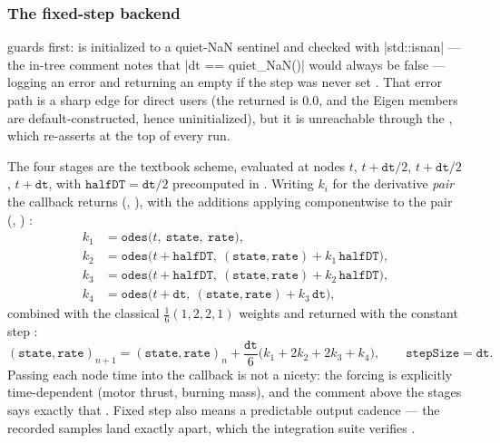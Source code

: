 \subsubsection{The fixed-step backend}\label{sec:simcore-rk4}

 guards first:  is initialized to a quiet-NaN sentinel
 and checked with \cppinline|std::isnan| --- the in-tree comment notes
that \cppinline|dt == quiet_NaN()| would always be false --- logging an error and returning an
empty  if the step was never set . That error
path is a sharp edge for direct users (the returned  is $0.0$, and the Eigen
members are default-constructed, hence uninitialized), but it is unreachable through the
, which re-asserts  at the top of every run.

The four stages are the textbook scheme, evaluated at nodes $t$, $t+\mathtt{dt}/2$,
$t+\mathtt{dt}/2$, $t+\mathtt{dt}$, with $\mathtt{halfDT}=\mathtt{dt}/2$ precomputed in
 . Writing $k_i$ for the derivative \emph{pair} the
callback returns (, ), with the additions applying componentwise to
the pair (, ) :
\begin{align}
k_1 &= \mathtt{odes}\bigl(t,\ \mathtt{state},\ \mathtt{rate}\bigr), \nonumber\\
k_2 &= \mathtt{odes}\bigl(t+\mathtt{halfDT},\ (\mathtt{state},\mathtt{rate}) + k_1\,\mathtt{halfDT}\bigr), \nonumber\\
k_3 &= \mathtt{odes}\bigl(t+\mathtt{halfDT},\ (\mathtt{state},\mathtt{rate}) + k_2\,\mathtt{halfDT}\bigr), \nonumber\\
k_4 &= \mathtt{odes}\bigl(t+\mathtt{dt},\ (\mathtt{state},\mathtt{rate}) + k_3\,\mathtt{dt}\bigr),
\label{eq:simcore-rk4stages}
\end{align}
combined with the classical $\tfrac16(1,2,2,1)$ weights and returned with the constant step
:
\begin{equation}\label{eq:simcore-rk4}
(\mathtt{state},\mathtt{rate})_{n+1}
 = (\mathtt{state},\mathtt{rate})_n
 + \frac{\mathtt{dt}}{6}\bigl(k_1 + 2k_2 + 2k_3 + k_4\bigr),
\qquad \mathtt{stepSize} = \mathtt{dt}.
\end{equation}
Passing each node time into the callback is not a nicety: the forcing is explicitly
time-dependent (motor thrust, burning mass), and the comment above the stages says exactly that
. Fixed step also means a predictable output cadence --- the recorded
samples land exactly  apart, which the integration suite verifies
.

